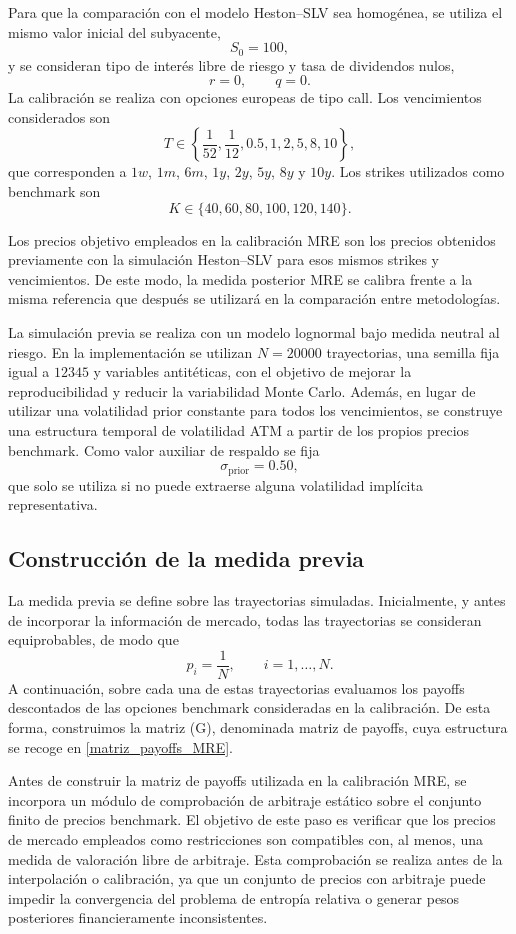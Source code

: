 Para que la comparación con el modelo Heston--SLV sea homogénea, se utiliza el mismo valor inicial del subyacente,
\[
S_0=100,
\]
y se consideran tipo de interés libre de riesgo y tasa de dividendos nulos,
\[
r=0, \qquad q=0.
\]
La calibración se realiza con opciones europeas de tipo call. Los vencimientos considerados son
\[
T\in
\left\{
\frac{1}{52},
\frac{1}{12},
0.5,
1,
2,
5,
8,
10
\right\},
\]
que corresponden a \(1w\), \(1m\), \(6m\), \(1y\), \(2y\), \(5y\), \(8y\) y \(10y\). Los strikes utilizados como benchmark son
\[
K\in\{40,60,80,100,120,140\}.
\]

Los precios objetivo empleados en la calibración MRE son los precios obtenidos previamente con la simulación Heston--SLV para esos mismos strikes y vencimientos. De este modo, la medida posterior MRE se calibra frente a la misma referencia que después se utilizará en la comparación entre metodologías.

La simulación previa se realiza con un modelo lognormal bajo medida neutral al riesgo. En la implementación se utilizan \(N=20000\) trayectorias, una semilla fija igual a \(12345\) y variables antitéticas, con el objetivo de mejorar la reproducibilidad y reducir la variabilidad Monte Carlo. Además, en lugar de utilizar una volatilidad prior constante para todos los vencimientos, se construye una estructura temporal de volatilidad ATM a partir de los propios precios benchmark. Como valor auxiliar de respaldo se fija
\[
\sigma_{\mathrm{prior}}=0.50,
\]
que solo se utiliza si no puede extraerse alguna volatilidad implícita representativa.

\subsection{Construcción de la medida previa}

La medida previa se define sobre las trayectorias simuladas. Inicialmente, y antes de incorporar la información de mercado, todas las trayectorias se consideran equiprobables, de modo que
\[
p_i=\frac{1}{N}, \qquad i=1,\ldots,N.
\]
A continuación, sobre cada una de estas trayectorias evaluamos los payoffs descontados de las opciones benchmark consideradas en la calibración. De esta forma, construimos la matriz (G), denominada matriz de payoffs, cuya estructura se recoge en \ref{matriz_payoffs_MRE}.\medskip

Antes de construir la matriz de payoffs utilizada en la calibración MRE, se incorpora un módulo de comprobación de arbitraje estático sobre el conjunto finito de precios benchmark. El objetivo de este paso es verificar que los precios de mercado empleados como restricciones son compatibles con, al menos, una medida de valoración libre de arbitraje. Esta comprobación se realiza antes de la interpolación o calibración, ya que un conjunto de precios con arbitraje puede impedir la convergencia del problema de entropía relativa o generar pesos posteriores financieramente inconsistentes.

